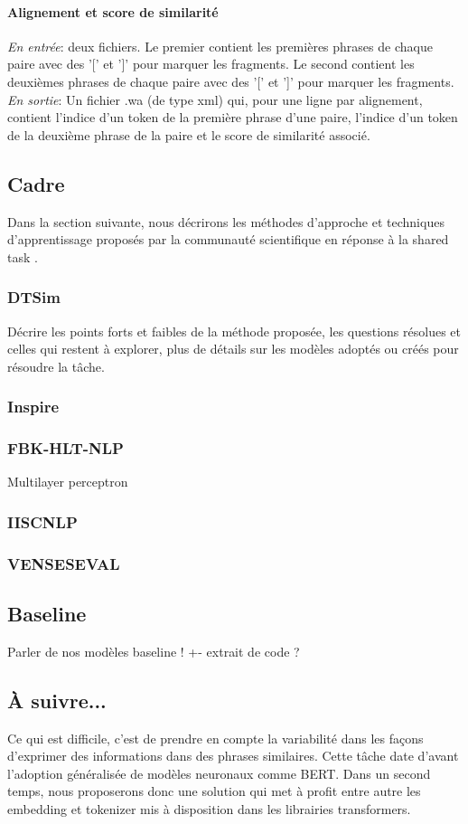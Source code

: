 \documentclass[a4paper, twoside, 11pt]{article}
\begin{document}
 \paragraph{Alignement et score de similarité}
    \hfill \break
    \textit{En entrée}: deux fichiers. Le premier contient les premières phrases de chaque paire avec des '[' et ']' pour marquer les fragments. Le second contient les deuxièmes phrases de chaque paire avec des '[' et ']' pour marquer les fragments. \hfill \break
    \textit{En sortie}: Un fichier .wa (de type xml) qui, pour une ligne par alignement, contient l'indice d'un token de la première phrase d'une paire, l'indice d'un token de la deuxième phrase de la paire et le score de similarité associé.

    \subsection{Cadre}

    Dans la section suivante, nous décrirons les méthodes d'approche et techniques d'apprentissage proposés par la communauté scientifique en réponse à la \og shared task \fg{}.

        \subsubsection{DTSim}
        Décrire les points forts et faibles de la méthode proposée, les questions résolues et celles qui restent à explorer, plus de détails sur les modèles adoptés ou créés pour résoudre la tâche.

        \subsubsection{Inspire}
        \subsubsection{FBK-HLT-NLP}
            Multilayer perceptron
        \subsubsection{IISCNLP}
        \subsubsection{VENSESEVAL}

    \subsection{Baseline}

    Parler de nos modèles baseline ! +- extrait de code ?

    \subsection{À suivre...}
     Ce qui est difficile, c’est de prendre en compte la variabilité dans les façons d’exprimer des informations dans des phrases similaires. Cette tâche date d’avant l’adoption généralisée de modèles neuronaux comme BERT. Dans un second temps, nous proposerons donc une solution qui met à profit entre autre les embedding et tokenizer mis à disposition dans les librairies transformers.
\end{document}
